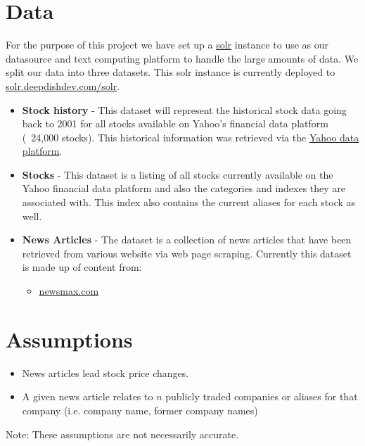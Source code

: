\documentclass[11pt,letterpaper]{article}
\newcommand{\blue}[1]{\textcolor{RoyalBlue}{#1}}
\newcommand{\instructions}[1]{\blue{\textit{#1}}}
\renewcommand{\instructions}[1]{}
\begin{document}
\section*{Data}
  For the purpose of this project we have set up a \href{http://lucene.apache.org/solr/}{solr} instance to use as our datasource and text computing platform to handle the large amounts of data.  We split our data into three datasets.  This solr instance is currently deployed to \href{http://solr.deepdishdev.com:8983/solr}{solr.deepdishdev.com/solr}.

  \begin{itemize}
  	\item \textbf{Stock history}
		- This dataset will represent the historical stock data going back to 2001 for all stocks available on Yahoo's financial data platform (~24,000 stocks). This historical information was retrieved via the  \href{https://developer.yahoo.com/yql}{Yahoo data platform}.
	\item \textbf{Stocks}
		- This dataset is a listing of all stocks currently available on the Yahoo financial data platform and also the categories and indexes they are associated with.  This index also contains the current aliases for each stock as well.
	\item \textbf{News Articles}
		- The dataset is a collection of news articles that have been retrieved from various website via web page scraping.  Currently this dataset is made up of content from:
		\begin{itemize}
			\item \href{http://www.newsmax.com/archives/}{newsmax.com}
		\end{itemize}
  \end{itemize}

\section*{Assumptions}
  \begin{itemize}
  \item News articles lead stock price changes.
  \item A given news article relates to $n$ publicly traded companies or aliases for that company (i.e. company name, former company names)
  \end{itemize}
  Note: These assumptions are not necessarily accurate.

\instructions{Do you have data to train and test your system on? How
  will you evaluate your system?}
\end{document}
